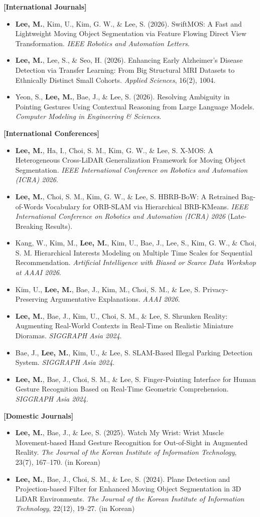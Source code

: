 \documentclass[letterpaper,11pt]{article}
\newcommand{\resumeItem}[1]{
  \item\small{
    {#1 \vspace{0pt}}
  }
}
\newcommand{\resumeSubHeadingListStart}{\begin{itemize}[leftmargin=*]}
\newcommand{\resumeSubHeadingListEnd}{\end{itemize}}
\begin{document}
\vspace{4pt}
\textbf{[International Journals]}
\resumeSubHeadingListStart
\resumeItem{\textbf{Lee, M.}, Kim, U., Kim, G. W., \& Lee, S. (2026). SwiftMOS: A Fast and Lightweight Moving Object Segmentation via Feature Flowing Direct View Transformation. \textit{IEEE Robotics and Automation Letters}.}
\resumeItem{\textbf{Lee, M.}, Lee, S., \& Seo, H. (2026). Enhancing Early Alzheimer's Disease Detection via Transfer Learning: From Big Structural MRI Datasets to Ethnically Distinct Small Cohorts. \textit{Applied Sciences}, 16(2), 1004.}
\resumeItem{Yeon, S., \textbf{Lee, M.}, Bae, J., \& Lee, S. (2026). Resolving Ambiguity in Pointing Gestures Using Contextual Reasoning from Large Language Models. \textit{Computer Modeling in Engineering \& Sciences}.}
\resumeSubHeadingListEnd

\textbf{[International Conferences]}
\resumeSubHeadingListStart
\resumeItem{\textbf{Lee, M.}, Ha, I., Choi, S. M., Kim, G. W., \& Lee, S. X-MOS: A Heterogeneous Cross-LiDAR Generalization Framework for Moving Object Segmentation. \textit{IEEE International Conference on Robotics and Automation (ICRA) 2026}.}
\resumeItem{\textbf{Lee, M.}, Choi, S. M., Kim, G. W., \& Lee, S. HBRB-BoW: A Retrained Bag-of-Words Vocabulary for ORB-SLAM via Hierarchical BRB-KMeans. \textit{IEEE International Conference on Robotics and Automation (ICRA) 2026} (Late-Breaking Results).}
\resumeItem{Kang, W., Kim, M., \textbf{Lee, M.}, Kim, U., Bae, J., Lee, S., Kim, G. W., \& Choi, S. M. Hierarchical Interests Modeling on Multiple Time Scales for Sequential Recommendation. \textit{Artificial Intelligence with Biased or Scarce Data Workshop at AAAI 2026}.}
\resumeItem{Kim, U., \textbf{Lee, M.}, Bae, J., Kim, M., Choi, S. M., \& Lee, S. Privacy-Preserving Argumentative Explanations. \textit{AAAI 2026}.}
\resumeItem{\textbf{Lee, M.}, Bae, J., Kim, U., Choi, S. M., \& Lee, S. Shrunken Reality: Augmenting Real-World Contexts in Real-Time on Realistic Miniature Dioramas. \textit{SIGGRAPH Asia 2024}.}
\resumeItem{Bae, J., \textbf{Lee, M.}, Kim, U., \& Lee, S. SLAM-Based Illegal Parking Detection System. \textit{SIGGRAPH Asia 2024}.}
\resumeItem{\textbf{Lee, M.}, Bae, J., Choi, S. M., \& Lee, S. Finger-Pointing Interface for Human Gesture Recognition Based on Real-Time Geometric Comprehension. \textit{SIGGRAPH Asia 2024}.}
\resumeSubHeadingListEnd

\textbf{[Domestic Journals]}
\resumeSubHeadingListStart
\resumeItem{\textbf{Lee, M.}, Bae, J., \& Lee, S. (2025). Watch My Wrist: Wrist Muscle Movement-based Hand Gesture Recognition for Out-of-Sight in Augmented Reality. \textit{The Journal of the Korean Institute of Information Technology}, 23(7), 167--170. (in Korean)}
\resumeItem{\textbf{Lee, M.}, Bae, J., Choi, S. M., \& Lee, S. (2024). Plane Detection and Projection-based Filter for Enhanced Moving Object Segmentation in 3D LiDAR Environments. \textit{The Journal of the Korean Institute of Information Technology}, 22(12), 19--27. (in Korean)}
\resumeSubHeadingListEnd
\end{document}
